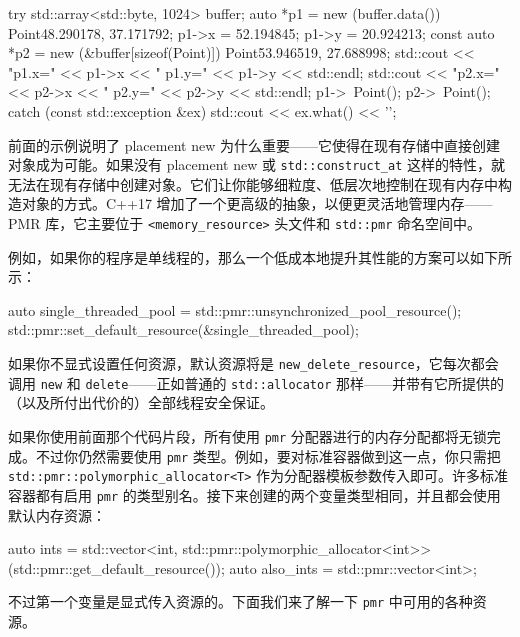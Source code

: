 \begin{codebox}[cpp]
try {
    std::array<std::byte, 1024> buffer;
    auto *p1 = new (buffer.data()) Point{48.290178, 37.171792};
    p1->x = 52.194845;
    p1->y = 20.924213;
const auto *p2 = new (&buffer[sizeof(Point)]) Point{53.946519, 27.688998};
    std::cout << "p1.x=" << p1->x << " p1.y=" << p1->y << std::endl;
    std::cout << "p2.x=" << p2->x << " p2.y=" << p2->y << std::endl;
    p1->~Point();
    p2->~Point();
} catch (const std::exception &ex) {
    std::cout << ex.what() << '\n';
}
\end{codebox}

前面的示例说明了 placement new 为什么重要——它使得在现有存储中直接创建对象成为可能。如果没有 placement new 或 \texttt{std::\allowbreak{}construct\_\allowbreak{}at} 这样的特性，就无法在现有存储中创建对象。它们让你能够细粒度、低层次地控制在现有内存中构造对象的方式。C++17 增加了一个更高级的抽象，以便更灵活地管理内存——PMR 库，它主要位于 \texttt{<memory\_\allowbreak{}resource>} 头文件和 \texttt{std::pmr} 命名空间中。

例如，如果你的程序是单线程的，那么一个低成本地提升其性能的方案可以如下所示：

\begin{codebox}[cpp]
auto single_threaded_pool = std::pmr::unsynchronized_pool_resource();
std::pmr::set_default_resource(&single_threaded_pool);
\end{codebox}

\label{idx:617}
如果你不显式设置任何资源，默认资源将是 \texttt{new\_\allowbreak{}delete\_\allowbreak{}resource}，它每次都会调用 \texttt{new} 和 \texttt{delete}——正如普通的 \texttt{std::\allowbreak{}allocator} 那样——并带有它所提供的（以及所付出代价的）全部线程安全保证。

如果你使用前面那个代码片段，所有使用 \texttt{pmr} 分配器进行的内存分配都将无锁完成。不过你仍然需要使用 \texttt{pmr} 类型。例如，要对标准容器做到这一点，你只需把 \texttt{std::\allowbreak{}pmr::\allowbreak{}polymorphic\_\allowbreak{}allocator<T>} 作为分配器模板参数传入即可。许多标准容器都有启用 \texttt{pmr} 的类型别名。接下来创建的两个变量类型相同，并且都会使用默认内存资源：

\begin{codebox}[cpp]
auto ints = std::vector<int, std::pmr::polymorphic_allocator<int>>(std::pmr::get_default_resource());
auto also_ints = std::pmr::vector<int>{};
\end{codebox}

不过第一个变量是显式传入资源的。下面我们来了解一下 \texttt{pmr} 中可用的各种资源。

